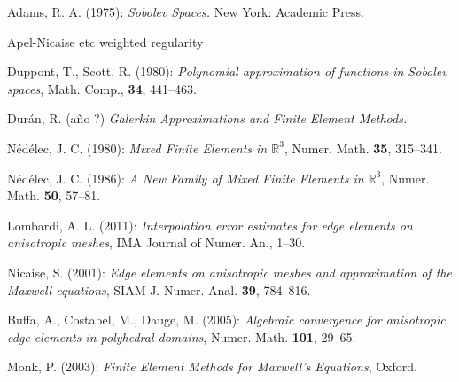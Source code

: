 \begin{thebibliography}{9}
Adams, R. A. (1975): \emph{Sobolev Spaces.} New York: Academic Press.

Apel-Nicaise etc weighted regularity 

Duppont, T., Scott, R. (1980): \emph{Polynomial approximation of functions in Sobolev spaces},
Math. Comp., \textbf{34}, 441--463.

Dur\'an, R. (a\~no ?) \emph{Galerkin Approximations and Finite Element Methods.}

N\'ed\'elec, J. C. (1980): \emph{Mixed Finite Elements in $\mathbb{R}^3$}, Numer. Math. \textbf{35},
315--341.

N\'ed\'elec, J. C. (1986): \emph{A New Family of Mixed Finite Elements in $\mathbb{R}^3$}, Numer. Math. 
\textbf{50}, 57--81.

Lombardi, A. L. (2011): \emph{Interpolation error estimates for edge elements on anisotropic meshes}, 
IMA Journal of Numer. An., 1--30.

Nicaise, S. (2001): \emph{Edge elements on anisotropic meshes and approximation of the Maxwell equations},
SIAM J. Numer. Anal. \textbf{39}, 784--816.

Buffa, A., Costabel, M., Dauge, M. (2005): \emph{Algebraic convergence for anisotro\-pic edge elements
in polyhedral domains}, Numer. Math. \textbf{101}, 29--65.

Monk, P. (2003): \emph{Finite Element Methods for Maxwell's Equations}, Oxford.
\end{thebibliography}